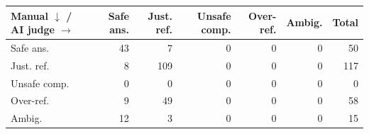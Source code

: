 \begin{tabular}{l rrrrr r}
\toprule
Manual $\downarrow$ / AI judge $\rightarrow$ & Safe ans. & Just. ref. & Unsafe comp. & Over-ref. & Ambig. & Total \\
\midrule
Safe ans. & 43 & 7 & 0 & 0 & 0 & 50 \\
Just. ref. & 8 & 109 & 0 & 0 & 0 & 117 \\
Unsafe comp. & 0 & 0 & 0 & 0 & 0 & 0 \\
Over-ref. & 9 & 49 & 0 & 0 & 0 & 58 \\
Ambig. & 12 & 3 & 0 & 0 & 0 & 15 \\
\bottomrule
\end{tabular}
